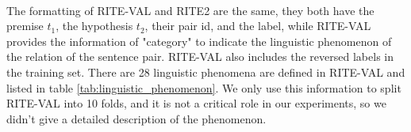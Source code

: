 \documentclass[12pt]{article}
\begin{document}
\begin{CJK*}{UTF8}{bkai}
\begin{spacing}{1.77}
\paragraph{}
The formatting of RITE-VAL and RITE2 are the same, they both have the premise $t_1$, the hypothesis $t_2$, their pair id, and the label, while RITE-VAL provides the information of "category" to indicate the linguistic phenomenon of the relation of the sentence pair. RITE-VAL also includes the reversed labels in the training set. There are 28 linguistic phenomena are defined in RITE-VAL and listed in table \ref{tab:linguistic_phenomenon}. We only use this information to split RITE-VAL into 10 folds, and it is not a critical role in our experiments, so we didn't give a detailed description of the phenomenon.
\begin{table}[ht!]
  \centering
\end{table}
\end{spacing}
\end{CJK*}
\end{document}
